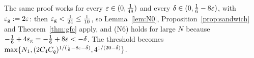 \begin{remark}\label{rem:B2eps}
The same proof works for every $\varepsilon\in(0,\frac1{48})$ and every $\delta\in(0,\frac16-8\varepsilon)$, with $\varepsilon_{\mathrm g}:=2\varepsilon$: then $\varepsilon_{\mathrm g}<\frac1{24}\le\frac1{10}$, so Lemma~\ref{lem:N0},
Proposition~\ref{prop:sandwich} and Theorem~\ref{thm:gfc} apply, and (N6) holds for large $N$ because $-\frac16+4\varepsilon_{\mathrm g}=-\frac16+8\varepsilon<-\delta$. The threshold becomes
$\max\{N_1,(2C_4C_q)^{1/(\frac16-8\varepsilon-\delta)},4^{1/(20-\delta)}\}$.
\end{remark}
